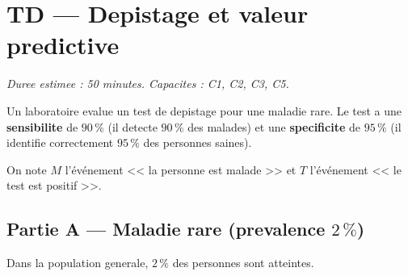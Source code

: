 
\section*{TD --- Depistage et valeur predictive}

\textit{Duree estimee : 50 minutes. Capacites : C1, C2, C3, C5.}

\bigskip

Un laboratoire evalue un test de depistage pour une maladie rare. Le test a une \textbf{sensibilite} de $90\,\%$ (il detecte $90\,\%$ des malades) et une \textbf{specificite} de $95\,\%$ (il identifie correctement $95\,\%$ des personnes saines).

On note $M$ l'événement << la personne est malade >> et $T$ l'événement << le test est positif >>.

\subsection*{Partie A --- Maladie rare (prevalence $2\,\%$)}

Dans la population generale, $2\,\%$ des personnes sont atteintes.

